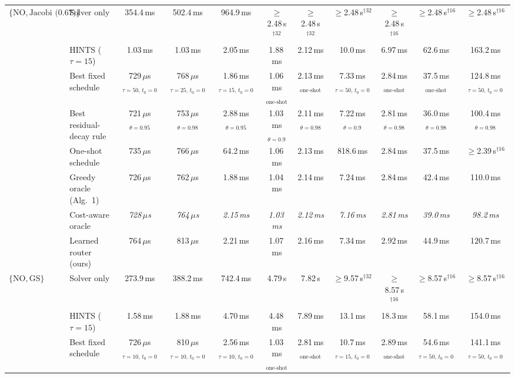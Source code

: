 {\begin{tabular}{llccccccccc}
\midrule
$\{\mathrm{NO}, \text{Jacobi (0.67)}\}$ & Solver only & 354.4\,ms & 502.4\,ms & 964.9\,ms & $\geq$2.48\,s$^{\dagger 32}$ & $\geq$2.48\,s$^{\dagger 32}$ & $\geq$2.48\,s$^{\dagger 32}$ & $\geq$2.48\,s$^{\dagger 16}$ & $\geq$2.48\,s$^{\dagger 16}$ & $\geq$2.48\,s$^{\dagger 16}$ \\
 & HINTS ($\tau{=}15$) & 1.03\,ms & 1.03\,ms & 2.05\,ms & 1.88\,ms & 2.12\,ms & 10.0\,ms & 6.97\,ms & 62.6\,ms & 163.2\,ms \\
 & Best fixed schedule & 729\,$\mu$s$_{\tau{=}50,\,t_0{=}0}$ & 768\,$\mu$s$_{\tau{=}25,\,t_0{=}0}$ & 1.86\,ms$_{\tau{=}15,\,t_0{=}0}$ & 1.06\,ms$_{\text{one-shot}}$ & 2.13\,ms$_{\text{one-shot}}$ & 7.33\,ms$_{\tau{=}50,\,t_0{=}0}$ & 2.84\,ms$_{\text{one-shot}}$ & 37.5\,ms$_{\text{one-shot}}$ & 124.8\,ms$_{\tau{=}50,\,t_0{=}0}$ \\
 & Best residual-decay rule & 721\,$\mu$s$_{\theta{=}0.95}$ & 753\,$\mu$s$_{\theta{=}0.98}$ & 2.88\,ms$_{\theta{=}0.95}$ & 1.03\,ms$_{\theta{=}0.9}$ & 2.11\,ms$_{\theta{=}0.98}$ & 7.22\,ms$_{\theta{=}0.9}$ & 2.81\,ms$_{\theta{=}0.98}$ & 36.0\,ms$_{\theta{=}0.98}$ & 100.4\,ms$_{\theta{=}0.98}$ \\
 & One-shot schedule & 735\,$\mu$s & 766\,$\mu$s & 64.2\,ms & 1.06\,ms & 2.13\,ms & 818.6\,ms & 2.84\,ms & 37.5\,ms & $\geq$2.39\,s$^{\dagger 16}$ \\
 & Greedy oracle (Alg.~1) & 726\,$\mu$s & 762\,$\mu$s & 1.88\,ms & 1.04\,ms & 2.14\,ms & 7.24\,ms & 2.84\,ms & 42.4\,ms & 110.0\,ms \\
 & Cost-aware oracle & \textit{728\,$\mu$s} & \textit{764\,$\mu$s} & \textit{2.15\,ms} & \textit{1.03\,ms} & \textit{2.12\,ms} & \textit{7.16\,ms} & \textit{2.81\,ms} & \textit{39.0\,ms} & \textit{98.2\,ms} \\
 & Learned router (ours) & 764\,$\mu$s & 813\,$\mu$s & 2.21\,ms & 1.07\,ms & 2.16\,ms & 7.34\,ms & 2.92\,ms & 44.9\,ms & 120.7\,ms \\
\midrule
$\{\mathrm{NO}, \text{GS}\}$ & Solver only & 273.9\,ms & 388.2\,ms & 742.4\,ms & 4.79\,s & 7.82\,s & $\geq$9.57\,s$^{\dagger 32}$ & $\geq$8.57\,s$^{\dagger 16}$ & $\geq$8.57\,s$^{\dagger 16}$ & $\geq$8.57\,s$^{\dagger 16}$ \\
 & HINTS ($\tau{=}15$) & 1.58\,ms & 1.88\,ms & 4.70\,ms & 4.48\,ms & 7.89\,ms & 13.1\,ms & 18.3\,ms & 58.1\,ms & 154.0\,ms \\
 & Best fixed schedule & 726\,$\mu$s$_{\tau{=}10,\,t_0{=}0}$ & 810\,$\mu$s$_{\tau{=}10,\,t_0{=}0}$ & 2.56\,ms$_{\tau{=}10,\,t_0{=}0}$ & 1.03\,ms$_{\text{one-shot}}$ & 2.81\,ms$_{\text{one-shot}}$ & 10.7\,ms$_{\tau{=}15,\,t_0{=}0}$ & 2.89\,ms$_{\text{one-shot}}$ & 54.6\,ms$_{\tau{=}50,\,t_0{=}0}$ & 141.1\,ms$_{\tau{=}50,\,t_0{=}0}$ \\

\end{tabular}}
